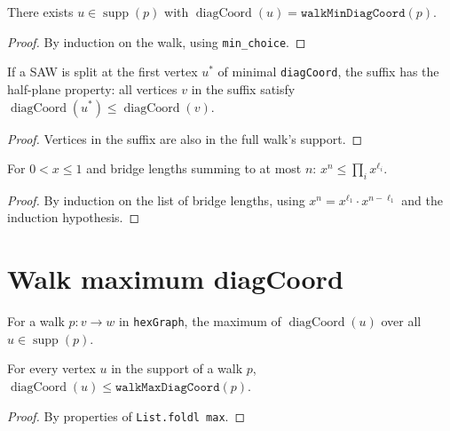 \begin{lemma}
\begin{lemma}\label{lem:walkMinDiagCoord_achieved}
\leanok
{}
  There exists $u \in \operatorname{supp}(p)$ with
  $\operatorname{diagCoord}(u) = \texttt{walkMinDiagCoord}(p)$.
\end{lemma}
\begin{proof}\leanok
  By induction on the walk, using \texttt{min\_choice}.
\end{proof}

\begin{lemma}\label{lem:saw_suffix_half_plane}
\leanok
  If a SAW is split at the first vertex $u^*$ of minimal \texttt{diagCoord},
  the suffix has the half-plane property: all vertices $v$ in the suffix
  satisfy $\operatorname{diagCoord}(u^*) \leq \operatorname{diagCoord}(v)$.
\end{lemma}
\begin{proof}\leanok
  Vertices in the suffix are also in the full walk's support.
\end{proof}

\begin{lemma}\label{lem:bridge_weight}
\leanok
  For $0 < x \leq 1$ and bridge lengths summing to at most $n$:
  $x^n \leq \prod_i x^{\ell_i}$.
\end{lemma}
\begin{proof}\leanok
  By induction on the list of bridge lengths, using
  $x^n = x^{\ell_1} \cdot x^{n-\ell_1}$ and the induction hypothesis.
\end{proof}

\section{Walk maximum diagCoord}\label{sec:walk_max_diag}

\begin{definition}\label{def:walkMaxDiagCoord}
\leanok
  For a walk $p : v \to w$ in \texttt{hexGraph}, the maximum of
  $\operatorname{diagCoord}(u)$ over all $u \in \operatorname{supp}(p)$.
\end{definition}

\begin{lemma}\label{lem:walkMaxDiagCoord_ge}
\leanok
{}
  For every vertex $u$ in the support of a walk $p$,
  $\operatorname{diagCoord}(u) \leq \texttt{walkMaxDiagCoord}(p)$.
\end{lemma}
\begin{proof}\leanok
  By properties of \texttt{List.foldl max}.
\end{proof}


\end{lemma}
